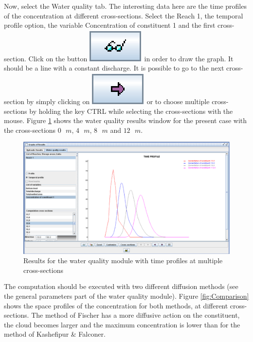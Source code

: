 \documentclass[a4paper,12pt]{article}
\begin{document}
Now, select the Water quality tab. The interesting data here are the
time profiles of the concentration at different cross-sections. Select
the Reach 1, the temporal profile option, the variable Concentration
of constituent 1 and the first cross-section. Click on the button
\includegraphics[scale=0.6]{show}
in order to draw the graph. It should be a line with a constant discharge.
It is possible to go to the next cross-section by simply clicking
on \includegraphics[scale=0.6]{avancer} or
to choose multiple cross-sections by holding the key CTRL while selecting
the cross-sections with the mouse. Figure \ref{fig:Results-wq} shows
the water quality results window for the present case with the cross-sections
$0\mbox{ }m$, $4\mbox{ }m$, $8\mbox{ }m$ and $12\mbox{ }m$.

\newpage

\begin{figure}[h]
  \begin{center}
  \includegraphics[scale=0.3]{results}
  \caption{Results for the water quality module with time profiles at multiple cross-sections}
  \label{fig:Results-wq}
  \end{center}
\end{figure}


The computation should be executed with two different diffusion methods
(see the general parameters part of the water quality module). 
Figure \ref{fig:Comparison} shows the space profiles of the concentration
for both methods, at different cross-sections. The method of Fischer
has a more diffusive action on the constituent, the cloud becomes larger
and the maximum concentration is lower than for the method of Kashefipur
\& Falconer. 
\end{document}
